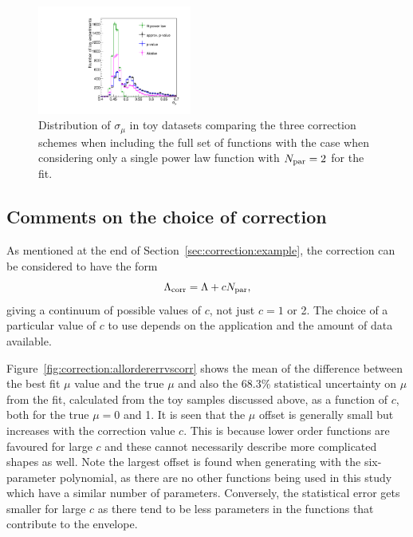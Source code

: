 \begin{figure}[tbp]
\centering
\includegraphics[width=0.45\textwidth]{correction/compare_error_magnitude.pdf}
\caption{Distribution of $\sigma_{\mu}$ in toy datasets
comparing the three correction schemes
when including the full set of functions
with the case when considering only a single power law function
with $N_{\rm par}=2$ for the fit.}
\label{fig:correction:compareerrors}
\end{figure}

\subsection{Comments on the choice of correction}
\label{sec:correction:comments}
 As mentioned at the end of Section~\ref{sec:correction:example},
the correction can be considered to have the form
\begin{displaymath}
\Lambda_{\mathrm{corr}} = \textrm{\ensuremath{\Lambda}} + cN_{\rm par},
\end{displaymath}
giving a continuum of possible values of $c$, not just $c=1$ or 2.
The choice of a particular value of $c$ to use depends on the application
and the amount of data available.

Figure~\ref{fig:correction:allordererrvscorr} shows the mean of the difference
between the best fit $\mu$ value and the true $\mu$ and also the 68.3\%
statistical uncertainty on $\mu$ from the fit, calculated from the toy
samples discussed above, as a function of $c$,
both for the true $\mu=0$ and 1. It is seen that the $\mu$ offset
is generally small but increases with the correction value $c$. This is
because lower order functions are favoured for large $c$ and these cannot
necessarily describe more complicated shapes as well. Note the largest
offset is found when generating with the six-parameter polynomial, as there
are no other functions being used in this study which have a similar number
of parameters.
Conversely, the
statistical error gets smaller for large $c$ as there tend to be less parameters
in the functions that contribute to the envelope.


